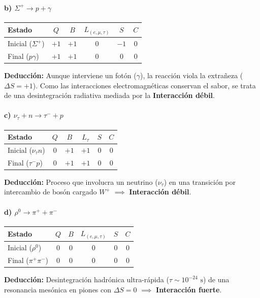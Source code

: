 \begin{problema}
\paragraph{b) $\Sigma^+ \rightarrow p + \gamma$}
\begin{center}
\small
\begin{tabular}{lccccc}
\toprule
\textbf{Estado} & $Q$ & $B$ & $L_{(e,\mu,\tau)}$ & $S$ & $C$ \\
\midrule
Inicial ($\Sigma^+$) & $+1$ & $+1$ & $0$ & $-1$ & $0$ \\
Final ($p \gamma$) & $+1$ & $+1$ & $0$ & $0$ & $0$ \\
\bottomrule
\end{tabular}
\end{center}
\textbf{Deducción:} Aunque interviene un fotón ($\gamma$), la reacción viola la extrañeza ($\Delta S = +1$). Como las interacciones electromagnéticas conservan el sabor, se trata de una desintegración radiativa mediada por la \textbf{Interacción débil}.

\paragraph{c) $\nu_\tau + n \rightarrow \tau^- + p$}
\begin{center}
\small
\begin{tabular}{lccccc}
\toprule
\textbf{Estado} & $Q$ & $B$ & $L_\tau$ & $S$ & $C$ \\
\midrule
Inicial ($\nu_\tau n$) & $0$ & $+1$ & $+1$ & $0$ & $0$ \\
Final ($\tau^- p$) & $0$ & $+1$ & $+1$ & $0$ & $0$ \\
\bottomrule
\end{tabular}
\end{center}
\textbf{Deducción:} Proceso que involucra un neutrino ($\nu_\tau$) en una transición por intercambio de bosón cargado $W^+$ $\implies$ \textbf{Interacción débil}.

\paragraph{d) $\rho^0 \rightarrow \pi^+ + \pi^-$}
\begin{center}
\small
\begin{tabular}{lccccc}
\toprule
\textbf{Estado} & $Q$ & $B$ & $L_{(e,\mu,\tau)}$ & $S$ & $C$ \\
\midrule
Inicial ($\rho^0$) & $0$ & $0$ & $0$ & $0$ & $0$ \\
Final ($\pi^+ \pi^-$) & $0$ & $0$ & $0$ & $0$ & $0$ \\
\bottomrule
\end{tabular}
\end{center}
\textbf{Deducción:} Desintegración hadrónica ultra-rápida ($\tau \sim 10^{-24}\text{ s}$) de una resonancia mesónica en piones con $\Delta S = 0$ $\implies$ \textbf{Interacción fuerte}.


\end{problema}
